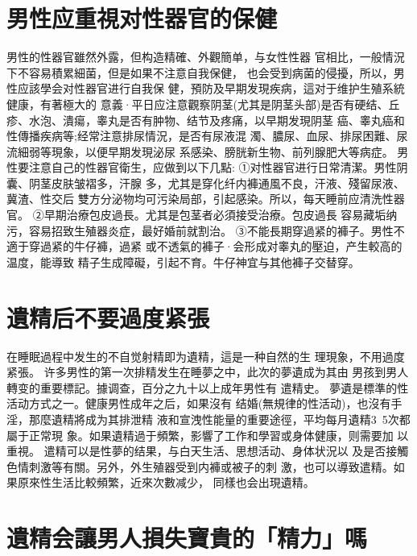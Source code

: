 \documentclass[12pt,UTF8]{ctexbook}
\begin{document}
\section{男性应重視对性器官的保健}

男性的性器官雖然外露，但构造精確、外觀簡单，与女性性器
官相比，一般情況下不容易積累細菌，但是如果不注意自我保健，
也会受到病菌的侵擾，所以，男性应該學会对性器官进行自我保
健，預防及早期发現疾病，這对于维护生殖系統健康，有著極大的
意義·平日应注意觀察阴茎(尤其是阴茎头部)是否有硬结、丘
疹、水泡、潰瘍，睾丸是否有肿物、结节及疼痛，以早期发現阴茎
癌、睾丸癌和性傳播疾病等;经常注意排尿情況，是否有尿液混
濁、膿尿、血尿、排尿困難、尿流細弱等現象，以便早期发現泌尿
系感染、膀胱新生物、前列腺肥大等病症。
男性要注意自己的性器官衛生，应做到以下几點:
①对性器官进行日常清潔。男性阴囊、阴茎皮肤皱褶多，汗腺
多，尤其是穿化纤内褲通風不良，汗液、殘留尿液、冀渣、性交后
雙方分泌物均可污染局部，引起感染。所以，每天睡前应清洗性器
官。
②早期治療包皮過長。尤其是包茎者必須接受治療。包皮過長
容易藏垢纳污，容易招致生殖器炎症，最好婚前就割治。
③不能長期穿過紧的褲子。男性不適于穿過紧的牛仔褲，過紧
或不透氣的褲子·会形成对睾丸的壓迫，产生較高的温度，能導致
精子生成障礙，引起不育。牛仔神宜与其他褲子交替穿。

\section{遺精后不要過度紧張}

在睡眠過程中发生的不自觉射精即为遺精，這是一种自然的生
理現象，不用過度紧張。
许多男性的第一次排精发生在睡夢之中，此次的夢遺成为其由
男孩到男人轉变的重要標記。據调查，百分之九十以上成年男性有
遣精史。
夢遺是標準的性活动方式之一。健康男性成年之后，如果沒有
结婚(無規律的性活动)，也沒有手淫，那麼遺精將成为其排泄精
液和宣洩性能量的重要途徑，平均每月遺精3~5次都屬于正常現
象。如果遺精過于頻繁，影響了工作和學習或身体健康，则需要加
以重視。
遣精可以是性夢的结果，与白天生活、思想活动、身体状況以
及是否接觸色情刺激等有關。另外，外生殖器受到内褲或被子的刺
激，也可以導致遣精。如果原來性生活比較頻繁，近來次數减少，
同樣也会出現遺精。

\section{遺精会讓男人損失寶貴的「精力」嗎}
\end{document}
